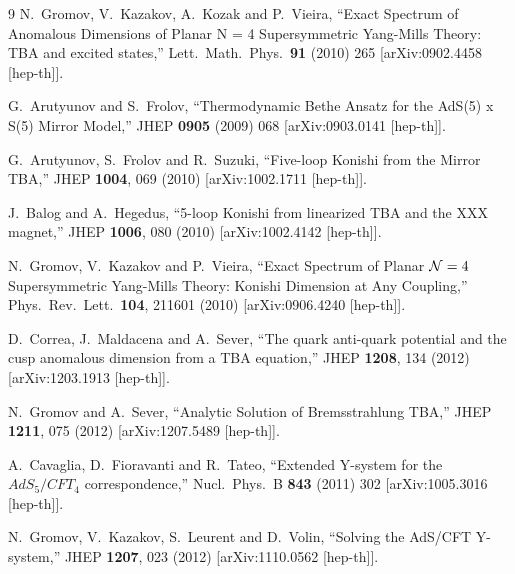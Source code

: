 \documentclass[a4paper,11pt]{article}
\numberwithin{equation}{section}
\begin{document}
\begin{thebibliography} {9}
  N.~Gromov, V.~Kazakov, A.~Kozak and P.~Vieira,
  ``Exact Spectrum of Anomalous Dimensions of Planar N = 4 Supersymmetric Yang-Mills Theory: TBA and excited states,''
  Lett.\ Math.\ Phys.\  {\bf 91} (2010) 265
  [arXiv:0902.4458 [hep-th]].

  G.~Arutyunov and S.~Frolov,
  ``Thermodynamic Bethe Ansatz for the AdS(5) x S(5) Mirror Model,''
  JHEP {\bf 0905} (2009) 068
  [arXiv:0903.0141 [hep-th]].

  G.~Arutyunov, S.~Frolov and R.~Suzuki,
  ``Five-loop Konishi from the Mirror TBA,''
  JHEP {\bf 1004}, 069 (2010)
  [arXiv:1002.1711 [hep-th]].

  J.~Balog and A.~Hegedus,
  ``5-loop Konishi from linearized TBA and the XXX magnet,''
  JHEP {\bf 1006}, 080 (2010)
  [arXiv:1002.4142 [hep-th]].

  N.~Gromov, V.~Kazakov and P.~Vieira,
  ``Exact Spectrum of Planar ${\cal N}=4$ Supersymmetric Yang-Mills Theory: Konishi Dimension at Any Coupling,''
  Phys.\ Rev.\ Lett.\  {\bf 104}, 211601 (2010)
  [arXiv:0906.4240 [hep-th]].

  D.~Correa, J.~Maldacena and A.~Sever,
  ``The quark anti-quark potential and the cusp anomalous dimension from a TBA equation,''
  JHEP {\bf 1208}, 134 (2012)
  [arXiv:1203.1913 [hep-th]].

  N.~Gromov and A.~Sever,
  ``Analytic Solution of Bremsstrahlung TBA,''
  JHEP {\bf 1211}, 075 (2012)
  [arXiv:1207.5489 [hep-th]].

  A.~Cavaglia, D.~Fioravanti and R.~Tateo,
  ``Extended Y-system for the $AdS_5/CFT_4$ correspondence,''
  Nucl.\ Phys.\ B {\bf 843} (2011) 302
  [arXiv:1005.3016 [hep-th]].

  N.~Gromov, V.~Kazakov, S.~Leurent and D.~Volin,
  ``Solving the AdS/CFT Y-system,''
  JHEP {\bf 1207}, 023 (2012)
  [arXiv:1110.0562 [hep-th]].


\end{thebibliography}
\end{document}
